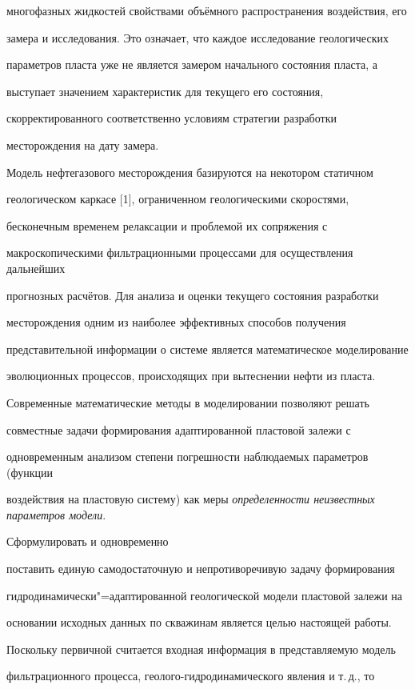 многофазных жидкостей свойствами объёмного распространения воздействия, его

замера и исследования. Это означает, что каждое исследование геологических

параметров пласта уже не является замером начального состояния пласта, а

выступает значением характеристик для текущего его состояния,

скорректированного соответственно условиям стратегии разработки

месторождения на дату замера.



Модель нефтегазового месторождения базируются на некотором статичном

геологическом каркасе [1], ограниченном геологическими скоростями,

бесконечным временем релаксации и проблемой их сопряжения с

макроскопическими фильтрационными процессами для осуществления дальнейших

прогнозных расчётов. Для анализа и оценки текущего состояния разработки

месторождения одним из наиболее эффективных способов получения

представительной информации о системе является математическое моделирование

эволюционных процессов, происходящих при вытеснении нефти из пласта.

Современные математические методы в моделировании позволяют решать

совместные задачи формирования адаптированной пластовой залежи с

одновременным анализом степени погрешности наблюдаемых параметров (функции

воздействия на пластовую систему) как меры \textit{определенности неизвестных параметров модели}.

Сформулировать и одновременно

поставить единую самодостаточную и непротиворечивую задачу формирования

гидродинамически"=адаптированной геологической модели пластовой залежи на

основании исходных данных по скважинам является целью настоящей работы.



Поскольку первичной считается входная информация в представляемую модель

фильтрационного процесса, геолого-гидродинамического явления и т.\,д., то

